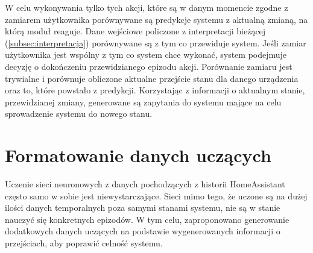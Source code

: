 W celu wykonywania tylko tych akcji, które są w danym momencie zgodne z zamiarem użytkownika porównywane są predykcje systemu z aktualną zmianą, na którą moduł reaguje. Dane wejściowe policzone z interpretacji bieżącej (\ref{subsec:interpretacja}) porównywane są z tym co przewiduje system. Jeśli zamiar użytkownika jest wspólny z tym co system chce wykonać, system podejmuje decyzję o dokończeniu przewidzianego epizodu akcji. Porównanie zamiaru jest trywialne i porównuje obliczone aktualne przejście stanu dla danego urządzenia oraz to, które powstało z predykcji. Korzystając z informacji o aktualnym stanie, przewidzianej zmiany, generowane są zapytania do systemu mające na celu sprowadzenie systemu do nowego stanu.

\section{Formatowanie danych uczących}
Uczenie sieci neuronowych z danych pochodzących z historii HomeAssistant często samo w sobie jest niewystarczające. Sieci mimo tego, że uczone są na dużej ilości danych temporalnych poza samymi stanami systemu, nie są w stanie nauczyć się konkretnych epizodów. W tym celu, zaproponowano generowanie dodatkowych danych uczących na podstawie wygenerowanych informacji o przejściach, aby poprawić celność systemu.

